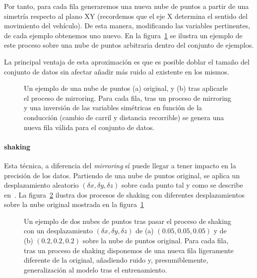 Por tanto, para cada fila generaremos una nueva nube de puntos a partir de una simetría respecto al plano XY (recordemos que el eje X determina el sentido del movimiento del vehículo). De esta manera, modificando las variables pertinentes, de cada ejemplo obtenemos uno nuevo. En la figura~\ref{fig:mirroring-example} se ilustra un ejemplo de este proceso sobre una nube de puntos arbitraria dentro del conjunto de ejemplos.

La principal ventaja de esta aproximación es que es posible doblar el tamaño del conjunto de datos sin afectar añadir más ruido al existente en los mismos.

\begin{figure}[t]
	\centering
	\qquad
	\caption[Ejemplo de la técnica de \textit{mirroring}]{Un ejemplo de una nube de puntos (a) original, y (b) tras aplicarle el proceso de mirroring. Para cada fila, tras un proceso de mirroring y una inversión de las variables simétricas en función de la conducción (cambio de carril y distancia recorrible) se genera una nueva fila válida para el conjunto de datos.}
	\label{fig:mirroring-example}
\end{figure}

\paragraph{shaking}

Esta técnica, a diferencia del \textit{mirroring} sí puede llegar a tener impacto en la precisión de los datos. Partiendo de una nube de puntos original, se aplica un desplazamiento aleatorio $(\delta x, \delta y, \delta z)$ sobre cada punto tal y como se describe en~\cite{EL PAPER CUANDO NOS LO PUBLIQUEN}. La figura~\ref{fig:shaking-example} ilustra dos procesos de shaking con diferentes desplazamientos sobre la nube original mostrada en la figura~\ref{fig:mirroring-example}

\begin{figure}[b]
	\centering
	\qquad
	\caption[Ejemplo de la técnica de \textit{shaking}]{Un ejemplo de dos nubes de puntos tras pasar el proceso de shaking con un desplazamiento $(\delta x, \delta y, \delta z)$ de (a) $(0.05, 0.05, 0.05)$ y de (b) $(0.2, 0.2, 0.2)$ sobre la nube de puntos original. Para cada fila, tras un proceso de shaking disponemos de una nueva fila ligeramente diferente de la original, añadiendo ruido y, presumiblemente, generalización al modelo tras el entrenamiento.}
	\label{fig:shaking-example}
\end{figure}

